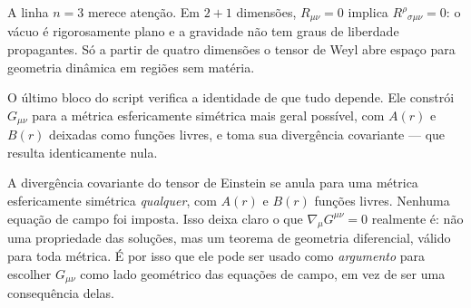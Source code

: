 A linha $n=3$ merece atenção. Em $2+1$ dimensões, $R_{\mu\nu}=0$ implica
$R^\rho{}_{\sigma\mu\nu}=0$: o vácuo é rigorosamente plano e a gravidade não
tem graus de liberdade propagantes. Só a partir de quatro dimensões o tensor
de Weyl abre espaço para geometria dinâmica em regiões sem matéria.

O último bloco do script verifica a identidade de que tudo depende. Ele
constrói $G_{\mu\nu}$ para a métrica esfericamente simétrica mais geral
possível, com $A(r)$ e $B(r)$ deixadas como funções livres, e toma sua
divergência covariante --- que resulta identicamente nula.

\begin{central}
A divergência covariante do tensor de Einstein se anula para uma métrica
esfericamente simétrica \emph{qualquer}, com $A(r)$ e $B(r)$ funções livres.
Nenhuma equação de campo foi imposta. Isso deixa claro o que
$\nabla_\mu G^{\mu\nu}=0$ realmente é: não uma propriedade das soluções, mas
um teorema de geometria diferencial, válido para toda métrica. É por isso que
ele pode ser usado como \emph{argumento} para escolher $G_{\mu\nu}$ como lado
geométrico das equações de campo, em vez de ser uma consequência delas.
\end{central}

